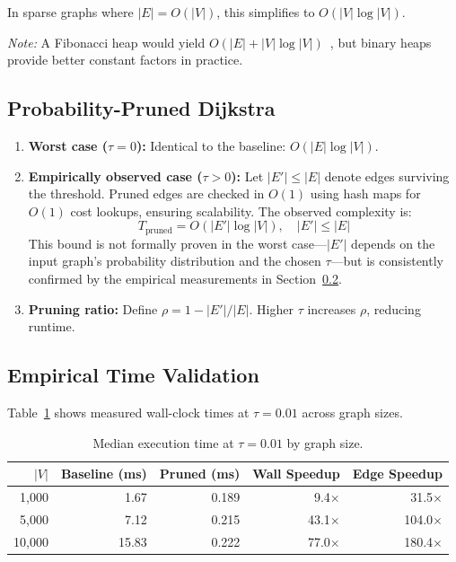 In sparse graphs where $|E|=O(|V|)$, this simplifies to $O(|V|\log|V|)$.

\textit{Note:} A Fibonacci heap would yield $O(|E|+|V|\log|V|)$~\citep{fredman1987fibonacci}, but binary heaps provide better constant factors in practice.

\subsection{Probability-Pruned Dijkstra}

\begin{enumerate}
    \item \textbf{Worst case ($\tau=0$):} Identical to the baseline: $O(|E|\log|V|)$.
    \item \textbf{Empirically observed case ($\tau>0$):} Let $|E'|\leq|E|$ denote edges surviving the threshold. Pruned edges are checked in $O(1)$ using hash maps for $O(1)$ cost lookups, ensuring scalability. The observed complexity is:
    \[
    T_{\text{pruned}} = O(|E'|\log|V|),\quad |E'|\leq|E|
    \]
    This bound is not formally proven in the worst case---$|E'|$ depends on the input graph's probability distribution and the chosen $\tau$---but is consistently confirmed by the empirical measurements in Section~\ref{sec:empirical_time}.
    \item \textbf{Pruning ratio:} Define $\rho = 1 - |E'|/|E|$. Higher $\tau$ increases $\rho$, reducing runtime.
\end{enumerate}

\subsection{Empirical Time Validation}
\label{sec:empirical_time}

Table~\ref{table:time_by_size} shows measured wall-clock times at $\tau=0.01$ across graph sizes.

\begin{table}[htbp]
\centering
\renewcommand{\arraystretch}{1.3}
\begin{tabular}{@{}rrrrr@{}}
\toprule
$|V|$ & \textbf{Baseline (ms)} & \textbf{Pruned (ms)} & \textbf{Wall Speedup} & \textbf{Edge Speedup} \\
\midrule
1,000  & 1.67 & 0.189 & 9.4$\times$ & 31.5$\times$ \\
5,000  & 7.12 & 0.215 & 43.1$\times$ & 104.0$\times$ \\
10,000 & 15.83 & 0.222 & 77.0$\times$ & 180.4$\times$ \\
\bottomrule
\end{tabular}
\caption[Execution time scaling by graph size]{Median execution time at $\tau=0.01$ by graph size.}
\label{table:time_by_size}
\end{table}

